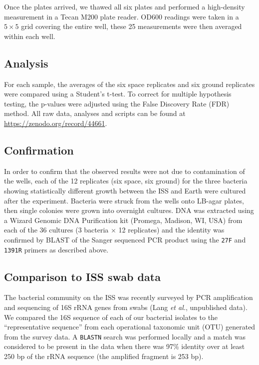 Once the plates arrived, we thawed all six plates and performed a high-density measurement in a Tecan M200 plate reader. OD600 readings were taken in a $5\times 5$ grid covering the entire well, these 25 measurements were then averaged within each well.

\subsection{Analysis}

For each sample, the averages of the six space replicates and six ground replicates were compared using a Student’s t-test. To correct for multiple hypothesis testing, the p-values were adjusted using the False Discovery Rate (FDR) method. \cite{benjamini_controlling_1995} All raw data, analyses and scripts can be found at \url{https://zenodo.org/record/44661}.

\subsection{Confirmation}

In order to confirm that the observed results were not due to contamination of the wells, each of the 12 replicates (six space, six ground) for the three bacteria showing statistically different growth between the ISS and Earth were cultured after the experiment. Bacteria were struck from the wells onto LB-agar plates, then single colonies were grown into overnight cultures. DNA was extracted using a Wizard Genomic DNA Purification kit (Promega, Madison, WI, USA) from each of the 36 cultures (3 bacteria $\times$ 12 replicates) and the identity was confirmed by BLAST of the Sanger sequenced PCR product using the {\tt 27F} and {\tt 1391R} primers as described above.

\subsection{Comparison to ISS swab data}

The bacterial community on the ISS was recently surveyed by PCR amplification and sequencing of 16S rRNA genes from swabs (Lang {\em et al.}, unpublished data). We compared the 16S sequence of each of our bacterial isolates to the ``representative sequence'' from each operational taxonomic unit (OTU) generated from the survey data. A {\tt BLASTN} search was performed locally and a match was considered to be present in the data when there was 97\% identity over at least 250 bp of the rRNA sequence (the amplified fragment is 253 bp).
